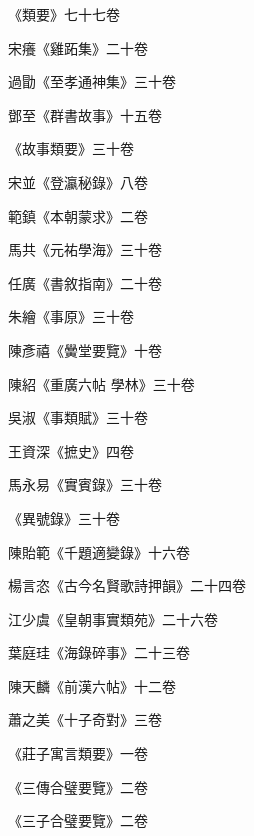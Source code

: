 \begin{pinyinscope}
 《類要》七十七卷



 宋癢《雞跖集》二十卷



 過勖《至孝通神集》三十卷



 鄧至《群書故事》十五卷



 《故事類要》三十卷



 宋並《登瀛秘錄》八卷



 範鎮《本朝蒙求》二卷



 馬共《元祐學海》三十卷



 任廣《書敘指南》二十卷



 朱繪《事原》三十卷



 陳彥禧《黌堂要覽》十卷



 陳紹《重廣六帖
 學林》三十卷



 吳淑《事類賦》三十卷



 王資深《摭史》四卷



 馬永易《實賓錄》三十卷



 《異號錄》三十卷



 陳貽範《千題適變錄》十六卷



 楊言恣《古今名賢歌詩押韻》二十四卷



 江少虞《皇朝事實類苑》二十六卷



 葉庭珪《海錄碎事》二十三卷



 陳天麟《前漢六帖》十二卷



 蕭之美《十子奇對》三卷



 《莊子寓言類要》一卷



 《三傳合璧要覽》二卷



 《三子合璧要覽》二卷




\end{pinyinscope}

